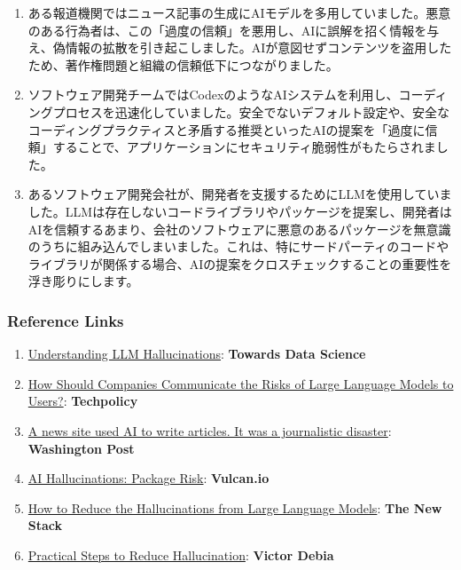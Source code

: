 \documentclass[
]{article}
\providecommand{\tightlist}{%
  \setlength{\itemsep}{0pt}\setlength{\parskip}{0pt}}
\begin{document}
\begin{enumerate}
\def\labelenumi{\arabic{enumi}.}
\tightlist
\item
  ある報道機関ではニュース記事の生成にAIモデルを多用していました。悪意のある行為者は、この「過度の信頼」を悪用し、AIに誤解を招く情報を与え、偽情報の拡散を引き起こしました。AIが意図せずコンテンツを盗用したため、著作権問題と組織の信頼低下につながりました。
\item
  ソフトウェア開発チームではCodexのようなAIシステムを利用し、コーディングプロセスを迅速化していました。安全でないデフォルト設定や、安全なコーディングプラクティスと矛盾する推奨といったAIの提案を「過度に信頼」することで、アプリケーションにセキュリティ脆弱性がもたらされました。
\item
  あるソフトウェア開発会社が、開発者を支援するためにLLMを使用していました。LLMは存在しないコードライブラリやパッケージを提案し、開発者はAIを信頼するあまり、会社のソフトウェアに悪意のあるパッケージを無意識のうちに組み込んでしまいました。これは、特にサードパーティのコードやライブラリが関係する場合、AIの提案をクロスチェックすることの重要性を浮き彫りにします。
\end{enumerate}

\subsubsection{Reference Links}\label{reference-links}

\begin{enumerate}
\def\labelenumi{\arabic{enumi}.}
\tightlist
\item
  \href{https://towardsdatascience.com/llm-hallucinations-ec831dcd7786}{Understanding
  LLM Hallucinations}: \textbf{Towards Data Science}
\item
  \href{https://techpolicy.press/how-should-companies-communicate-the-risks-of-large-language-models-to-users/}{How
  Should Companies Communicate the Risks of Large Language Models to
  Users?}: \textbf{Techpolicy}
\item
  \href{https://www.washingtonpost.com/media/2023/01/17/cnet-ai-articles-journalism-corrections/}{A
  news site used AI to write articles. It was a journalistic disaster}:
  \textbf{Washington Post}
\item
  \href{https://vulcan.io/blog/ai-hallucinations-package-risk}{AI
  Hallucinations: Package Risk}: \textbf{Vulcan.io}
\item
  \href{https://thenewstack.io/how-to-reduce-the-hallucinations-from-large-language-models/}{How
  to Reduce the Hallucinations from Large Language Models}: \textbf{The
  New Stack}
\item
  \href{https://newsletter.victordibia.com/p/practical-steps-to-reduce-hallucination}{Practical
  Steps to Reduce Hallucination}: \textbf{Victor Debia}
\end{enumerate}
\end{document}
